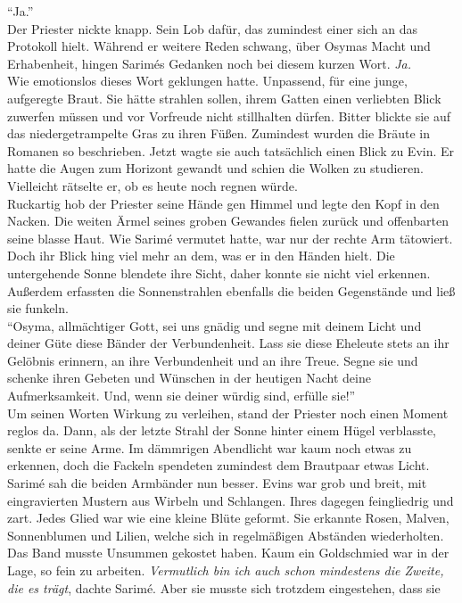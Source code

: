 ``Ja.''\\
Der Priester nickte knapp. Sein Lob dafür, das zumindest einer sich an das Protokoll hielt. Während 
er weitere Reden schwang, über Osymas Macht und Erhabenheit, hingen Sarimés Gedanken noch bei 
diesem kurzen Wort. \textit{Ja.}\\
Wie emotionslos dieses Wort geklungen hatte. Unpassend, für eine junge, aufgeregte Braut. Sie hätte 
strahlen sollen, ihrem Gatten einen verliebten Blick zuwerfen müssen und vor Vorfreude nicht 
stillhalten dürfen. Bitter blickte sie auf das niedergetrampelte Gras zu ihren Füßen. Zumindest 
wurden die Bräute in Romanen so beschrieben. Jetzt wagte sie auch tatsächlich einen Blick zu Evin. 
Er hatte die Augen zum Horizont gewandt und schien die Wolken zu studieren. Vielleicht rätselte er, 
ob es heute noch regnen würde.\\
Ruckartig hob der Priester seine Hände gen Himmel und legte den Kopf in den Nacken. Die weiten 
Ärmel seines groben Gewandes fielen zurück und offenbarten seine blasse Haut. Wie Sarimé vermutet 
hatte, war nur der rechte Arm tätowiert. Doch ihr Blick hing viel mehr an dem, was er in den Händen 
hielt. Die untergehende Sonne blendete ihre Sicht, daher konnte sie nicht viel erkennen. Außerdem 
erfassten die Sonnenstrahlen ebenfalls die beiden Gegenstände und ließ sie funkeln. \\
``Osyma, allmächtiger Gott, sei uns gnädig und segne mit deinem Licht und deiner Güte diese Bänder 
der Verbundenheit. Lass sie diese Eheleute stets an ihr Gelöbnis erinnern, an ihre Verbundenheit 
und an ihre Treue. Segne sie und schenke ihren Gebeten und Wünschen in der heutigen Nacht deine 
Aufmerksamkeit. Und, wenn sie deiner würdig sind, erfülle sie!''\\
Um seinen Worten Wirkung zu verleihen, stand der Priester noch einen Moment reglos da. Dann, als 
der letzte Strahl der Sonne hinter einem Hügel verblasste, senkte er seine Arme. Im dämmrigen 
Abendlicht war kaum noch etwas zu erkennen, doch die Fackeln spendeten zumindest dem Brautpaar 
etwas Licht. Sarimé sah die beiden Armbänder nun besser. Evins war grob und breit, mit 
eingravierten Mustern aus Wirbeln und Schlangen. Ihres dagegen feingliedrig und zart. Jedes Glied 
war wie eine kleine Blüte geformt. Sie erkannte Rosen, Malven, Sonnenblumen und Lilien, welche sich 
in regelmäßigen Abständen wiederholten. Das Band musste Unsummen gekostet haben. Kaum ein 
Goldschmied war in der Lage, so fein zu arbeiten. \textit{Vermutlich bin ich auch schon mindestens 
die Zweite, die es trägt}, dachte Sarimé. Aber sie musste sich trotzdem eingestehen, dass sie 
